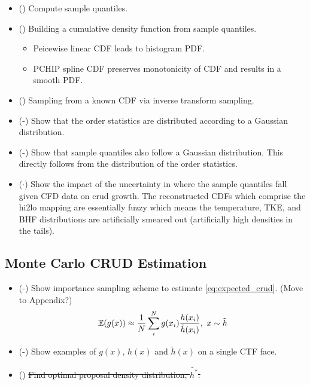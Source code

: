 \begin{itemize}
        \item (\checkmark) Compute sample quantiles.
        \item (\checkmark) Building a cumulative density function from sample quantiles.
        \begin{itemize}
           \item Peicewise linear CDF leads to histogram PDF.
           \item PCHIP spline CDF preserves monotonicity of CDF and results in a smooth PDF. \cite{Fritsch80}
        \end{itemize}
        \item (\checkmark) Sampling from a known CDF via inverse transform sampling.
        \item (\checkmark-) Show that the order statistics are distributed according to a Gaussian distribution.
        \item (\checkmark-) Show that sample quantiles also follow a Gaussian distribution.  This directly follows from the distribution of the order statistics.
        \item ($\cdot$) Show the impact of the uncertainty in where the sample quantiles fall given CFD data on crud growth.  The reconstructed CDFs which comprise the hi2lo mapping are essentially fuzzy which means the temperature, TKE, and BHF distributions are artificially smeared out (artificially high densities in the tails).
\end{itemize}

\subsection{Monte Carlo CRUD Estimation}

\begin{itemize}
        \item (\checkmark-) Show importance sampling scheme to estimate \ref{eq:expected_crud}.  (Move to Appendix?)
        \begin{equation}
        \operatorname*{\mathbb{E}}(g(x)) \approx \frac{1}{N} \sum_i^N g(x_i) \frac{h(x_i)}{\tilde h(x_i)}, \ x \sim \tilde{h}
        \end{equation}
        \item (\checkmark-) Show examples of $g(x)$, $h(x)$ and $\tilde h(x)$ on a single CTF face.
        \item (\xmark) \sout{Find optimal proposal density distribution, $\tilde{h^*}$.}
\end{itemize}


